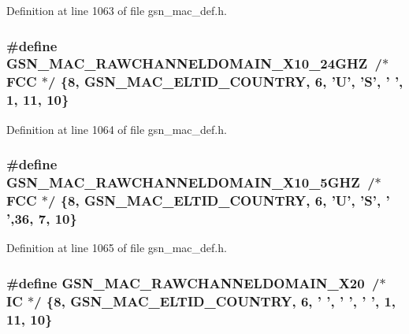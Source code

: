 Definition at line 1063 of file gsn\_\-mac\_\-def.h.

\hypertarget{a00642_ga500c98f87ed8a4f3682e4b1b660bfe3d}{
\subsubsection[{GSN\_\-MAC\_\-RAWCHANNELDOMAIN\_\-X10\_\-24GHZ}]{\setlength{\rightskip}{0pt plus 5cm}\#define GSN\_\-MAC\_\-RAWCHANNELDOMAIN\_\-X10\_\-24GHZ~/$\ast$ FCC    $\ast$/ \{8, GSN\_\-MAC\_\-ELTID\_\-COUNTRY, 6, 'U', 'S', ' ', 1, 11, 10\}}}
\label{a00642_ga500c98f87ed8a4f3682e4b1b660bfe3d}


Definition at line 1064 of file gsn\_\-mac\_\-def.h.

\hypertarget{a00642_ga942c8bca51fccd885216a358eb762f55}{
\subsubsection[{GSN\_\-MAC\_\-RAWCHANNELDOMAIN\_\-X10\_\-5GHZ}]{\setlength{\rightskip}{0pt plus 5cm}\#define GSN\_\-MAC\_\-RAWCHANNELDOMAIN\_\-X10\_\-5GHZ~/$\ast$ FCC    $\ast$/  \{8, GSN\_\-MAC\_\-ELTID\_\-COUNTRY, 6, 'U', 'S', ' ',36,  7, 10\}}}
\label{a00642_ga942c8bca51fccd885216a358eb762f55}


Definition at line 1065 of file gsn\_\-mac\_\-def.h.

\hypertarget{a00642_gacbfcc1079a6c770488a643ba72c66f78}{
\subsubsection[{GSN\_\-MAC\_\-RAWCHANNELDOMAIN\_\-X20}]{\setlength{\rightskip}{0pt plus 5cm}\#define GSN\_\-MAC\_\-RAWCHANNELDOMAIN\_\-X20~/$\ast$ IC     $\ast$/ \{8, GSN\_\-MAC\_\-ELTID\_\-COUNTRY, 6, ' ', ' ', ' ', 1, 11, 10\}}}
\label{a00642_gacbfcc1079a6c770488a643ba72c66f78}


